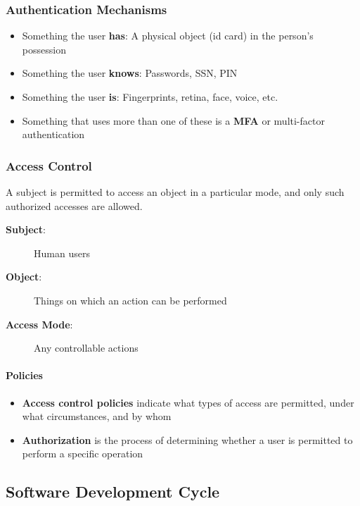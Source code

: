 \documentclass[11pt,a4paper]{article}
\begin{document}
\subsubsection{Authentication Mechanisms}

\begin{itemize}
    \item Something the user \textbf{has}: A physical object (id card) in the person's possession
    
    \item Something the user \textbf{knows}: Passwords, SSN, PIN
    
    \item Something the user \textbf{is}: Fingerprints, retina, face, voice, etc.
    
    \item Something that uses more than one of these is a \textbf{MFA} or multi-factor authentication
\end{itemize}

\subsubsection{Access Control}

A subject is permitted to access an object in a particular mode, and only such authorized accesses are allowed.

\begin{description}
    \item[\textbf{Subject}:] Human users
    \item[\textbf{Object}:] Things on which an action can be performed
    \item[\textbf{Access Mode}:] Any controllable actions
\end{description}

\paragraph{Policies}
\begin{itemize}
    \item \textbf{Access control policies} indicate what types of access are permitted, under what circumstances, and by whom
    \item \textbf{Authorization} is the process of determining whether a user is permitted to perform a specific operation
\end{itemize}

\subsection{Software Development Cycle}
\end{document}
